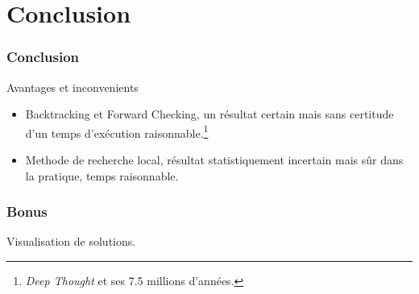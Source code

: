 \documentclass[9pt,a4paper]{beamer}
\begin{document}
\section{Conclusion}
\begin{frame}
	\frametitle{Conclusion}

	\begin{block}{Avantages et inconvenients}
	      \begin{itemize}
			\item{Backtracking et Forward Checking, un résultat certain mais sans certitude d'un temps d'exécution raisonnable.\footnote{\textit{Deep Thought} et ses 7.5 millions d'années.}}
			\item{Methode de recherche local, résultat statistiquement incertain mais sûr dans la pratique, temps raisonnable.}
	      \end{itemize}

	\end{block}
\end{frame}

\begin{frame}
	\frametitle{Bonus}

	Visualisation de solutions.
\end{frame}
\end{document}

